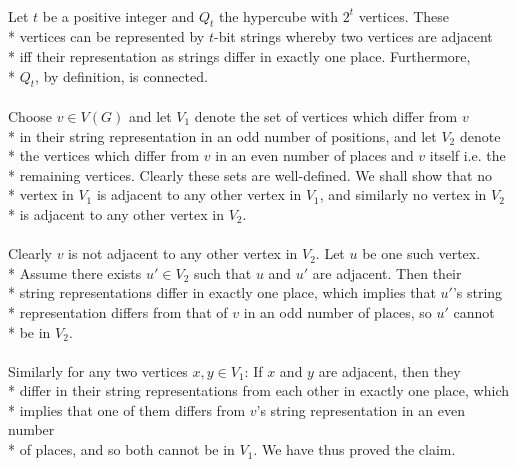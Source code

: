 \paragraph{}Let $t$ be a positive integer and $Q_t$ the hypercube with $2^t$ vertices. These\\* vertices can be represented by $t$-bit strings whereby two vertices are adjacent\\* iff their representation as strings differ in exactly one place. Furthermore,\\* $Q_t$, by definition, is connected.
\paragraph{}Choose $v \in V\left(G\right)$ and let $V_1$ denote the set of vertices which differ from $v$\\* in their string representation in an odd number of positions, and let $V_2$ denote\\* the vertices which differ from $v$ in an even number of places and $v$ itself i.e. the\\* remaining vertices. Clearly these sets are well-defined. We shall show that no\\* vertex in $V_1$ is adjacent to any other vertex in $V_1$, and similarly no vertex in $V_2$\\* is adjacent to any other vertex in $V_2$.

\paragraph{}Clearly $v$ is not adjacent to any other vertex in $V_2$. Let $u$ be one such vertex.\\* Assume there exists $u' \in V_2$ such that $u$ and $u'$ are adjacent. Then their\\* string representations differ in exactly one place, which implies that $u'$'s string\\* representation differs from that of $v$ in an odd number of places, so $u'$ cannot\\* be in $V_2$.

\paragraph{}Similarly for any two vertices $x,y \in V_1$: If $x$ and $y$ are adjacent, then they\\* differ in their string representations from each other in exactly one place, which\\* implies that one of them differs from $v$'s string representation in an even number\\* of places, and so both cannot be in $V_1$. We have thus proved the claim.
